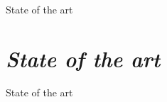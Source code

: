 
                 {State of the art}
\chapter{\textit{State of the art}}
\label{cap:trabajo}
                 {State of the art}







